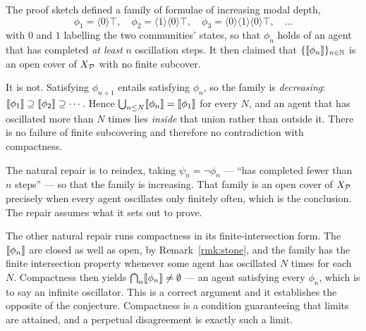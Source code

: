 \begin{remark}
\label{rmk:consensus-attempt}
The proof sketch defined a family of formulae of increasing modal
depth,
\[
  \phi_1 = \langle 0 \rangle\top, \quad
  \phi_2 = \langle 1 \rangle\langle 0 \rangle\top, \quad
  \phi_3 = \langle 0 \rangle\langle 1 \rangle\langle 0 \rangle\top,
  \quad \ldots
\]
with $0$ and $1$ labelling the two communities' states, so that
$\phi_n$ holds of an agent that has completed \emph{at least} $n$
oscillation steps.
It then claimed that $\{ \llbracket \phi_n \rrbracket \}_{n \in \mathbb{N}}$ is an open
cover of $X_{\mathcal{P}}$ with no finite subcover.

It is not.
Satisfying $\phi_{n+1}$ entails satisfying $\phi_n$, so the family is
\emph{decreasing}:
$\llbracket \phi_1 \rrbracket \supseteq \llbracket \phi_2 \rrbracket \supseteq \cdots$.
Hence $\bigcup_{n \le N} \llbracket \phi_n \rrbracket = \llbracket \phi_1 \rrbracket$ for
every $N$, and an agent that has oscillated more than $N$ times lies
\emph{inside} that union rather than outside it.
There is no failure of finite subcovering and therefore no
contradiction with compactness.

The natural repair is to reindex, taking $\psi_n = \neg\phi_n$ ---
``has completed fewer than $n$ steps'' --- so that the family is
increasing.
That family is an open cover of $X_{\mathcal{P}}$ precisely when every agent
oscillates only finitely often, which is the conclusion.
The repair assumes what it sets out to prove.

The other natural repair runs compactness in its finite-intersection
form.
The $\llbracket \phi_n \rrbracket$ are closed as well as open, by
Remark~\ref{rmk:stone}, and the family has the finite intersection
property whenever some agent has oscillated $N$ times for each $N$.
Compactness then yields
$\bigcap_n \llbracket \phi_n \rrbracket \neq \emptyset$ --- an agent satisfying
every $\phi_n$, which is to say an infinite oscillator.
This is a correct argument and it establishes the opposite of the
conjecture.
Compactness is a condition guaranteeing that limits are attained, and a
perpetual disagreement is exactly such a limit.
\end{remark}

